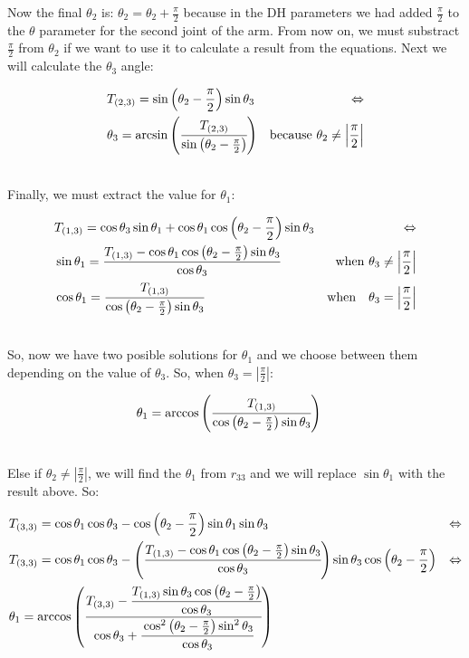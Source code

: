 Now the final \(\theta_2\) is: \(\theta_2 = \theta_2 + \frac{\pi}{2}\) because in the DH parameters we had added \(\frac{\pi}{2}\) to the \(\theta\) parameter for the second joint of the arm. From now on, we must substract \(\frac{\pi}{2}\) from \(\theta_2\) if we want to use it to calculate a result from the equations. Next we will calculate the $\theta_3$ angle:
\begin{small}
\begin{align*}
&T_{(2,3)} = \sin\left(\theta_2 - \frac{\pi}{2}\right)\sin\theta_3 &\Leftrightarrow \\
& \theta_3 = \arcsin\left( \cfrac{ T_{(2,3)} }{ \sin\left(\theta_2-\frac{\pi}{2}\right)}\right)  &\text{because }    \theta_2 \neq \left|\frac{\pi}{2}\right|
\end{align*}
\end{small}\\
Finally, we must extract the value for \(\theta_1\):
\begin{small}
\begin{align*}
&T_{(1,3)} = \cos\theta_3\sin\theta_1 + \cos\theta_1\cos\left(\theta_2 - \frac{\pi}{2}\right)\sin\theta_3 &\Leftrightarrow \\
&\sin\theta_1 = \cfrac{T_{(1,3)} - \cos\theta_1\cos\left(\theta_2 - \frac{\pi}{2}\right)\sin\theta_3}{\cos\theta_3}  &\text{when } \theta_3 \neq \left|\frac{\pi}{2}\right|\\
&\cos\theta_1 = \cfrac{T_{(1,3)}}{\cos\left(\theta_2 - \frac{\pi}{2}\right)\sin\theta_3}  &\text{when} \quad \theta_3 = \left|\frac{\pi}{2}\right|
\end{align*}
\end{small}\\
So, now we have two posible solutions for \(\theta_1\) and we choose between them depending on the value of \(\theta_3\). So, when $\theta_3 = \left|\frac{\pi}{2}\right|$:
\begin{small}
\begin{align*}
&\theta_1 = \arccos\left(\cfrac{T_{(1,3)}}{\cos\left(\theta_2 - \frac{\pi}{2}\right)\sin\theta_3}\right)
\end{align*}
\end{small}\\
Else if \(\theta_2 \neq \left|\frac{\pi}{2}\right|\), we will find the \(\theta_1\) from \(r_{33}\) and we will replace \(\sin\theta_1\) with the result above. So:
\begin{small}
\begin{align*}
&T_{(3,3)} = \cos\theta_1\cos\theta_3 - \cos\left(\theta_2 - \frac{\pi}{2}\right)\sin\theta_1\sin\theta_3 &\Leftrightarrow \\
&T_{(3,3)} = \cos\theta_1\cos\theta_3 - \left(\cfrac{T_{(1,3)} - \cos\theta_1\cos\left(\theta_2 - \frac{\pi}{2}\right)\sin\theta_3}{\cos\theta_3}\right)\sin\theta_3\cos\left(\theta_2 - \frac{\pi}{2}\right) &\Leftrightarrow \\
&\theta_1 = \arccos\left(\cfrac{T_{(3,3)} -\cfrac{ T_{(1,3)}\sin\theta_3\cos\left(\theta_2 - \frac{\pi}{2}\right)}{\cos\theta_3}}{\cos\theta_3 + \cfrac{\cos^2\left(\theta_2-\frac{\pi}{2}\right)\sin^2\theta_3}{\cos\theta_3}}\right)
\end{align*}
\end{small}\\
